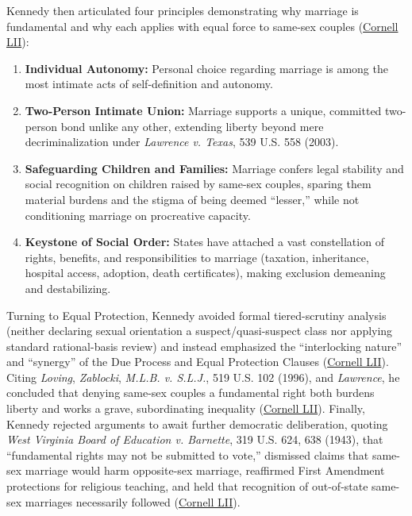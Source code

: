 \documentclass[12pt]{article}
\begin{document}
Kennedy then articulated four principles demonstrating why marriage is fundamental and why each applies with equal force to same-sex couples (\href{https://www.law.cornell.edu/supremecourt/text/14-556}{Cornell LII}):
\begin{enumerate}
    \item \textbf{Individual Autonomy:} Personal choice regarding marriage is among the most intimate acts of self-definition and autonomy.
    \item \textbf{Two-Person Intimate Union:} Marriage supports a unique, committed two-person bond unlike any other, extending liberty beyond mere decriminalization under \textit{Lawrence v. Texas}, 539 U.S. 558 (2003).
    \item \textbf{Safeguarding Children and Families:} Marriage confers legal stability and social recognition on children raised by same-sex couples, sparing them material burdens and the stigma of being deemed ``lesser,'' while not conditioning marriage on procreative capacity.
    \item \textbf{Keystone of Social Order:} States have attached a vast constellation of rights, benefits, and responsibilities to marriage (taxation, inheritance, hospital access, adoption, death certificates), making exclusion demeaning and destabilizing.
\end{enumerate}

Turning to Equal Protection, Kennedy avoided formal tiered-scrutiny analysis (neither declaring sexual orientation a suspect/quasi-suspect class nor applying standard rational-basis review) and instead emphasized the ``interlocking nature'' and ``synergy'' of the Due Process and Equal Protection Clauses (\href{https://www.law.cornell.edu/supremecourt/text/14-556}{Cornell LII}). Citing \textit{Loving}, \textit{Zablocki}, \textit{M.L.B. v. S.L.J.}, 519 U.S. 102 (1996), and \textit{Lawrence}, he concluded that denying same-sex couples a fundamental right both burdens liberty and works a grave, subordinating inequality (\href{https://www.law.cornell.edu/supremecourt/text/14-556}{Cornell LII}). Finally, Kennedy rejected arguments to await further democratic deliberation, quoting \textit{West Virginia Board of Education v. Barnette}, 319 U.S. 624, 638 (1943), that ``fundamental rights may not be submitted to vote,'' dismissed claims that same-sex marriage would harm opposite-sex marriage, reaffirmed First Amendment protections for religious teaching, and held that recognition of out-of-state same-sex marriages necessarily followed (\href{https://www.law.cornell.edu/supremecourt/text/14-556}{Cornell LII}).
\end{document}
